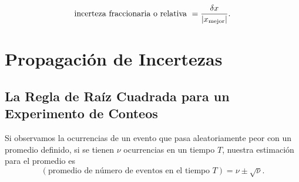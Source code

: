 \begin{definition}
	$$\text{incerteza fraccionaria o relativa } = \frac{\delta x}{\abs{x_{\text{mejor}}}}.$$
\end{definition}




\section{Propagación de Incertezas}

\subsection{La Regla de Raíz Cuadrada para un Experimento de Conteos}
\begin{definition}
	Si observamos la ocurrencias de un evento que pasa aleatoriamente peor con un promedio definido, si se tienen $\nu$ ocurrencias en un tiempo $T$, nuestra estimación para el promedio es
	\begin{equation}
		(\text{promedio de número de eventos en el tiempo } T) = \nu \pm \sqrt{\nu}.
	\end{equation}
\end{definition}

